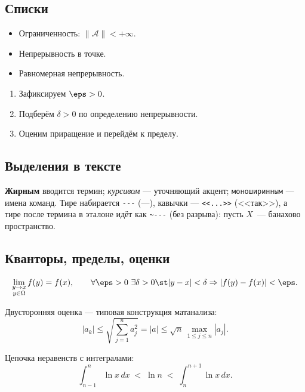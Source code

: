 
\subsection{Списки}

\begin{itemize}
	\item Ограниченность: $\|\mathcal{A}\| < +\infty$.
	\item Непрерывность в точке.
	\item Равномерная непрерывность.
\end{itemize}

\begin{enumerate}
	\item Зафиксируем $\eps > 0$.
	\item Подберём $\delta > 0$ по определению непрерывности.
	\item Оценим приращение и перейдём к пределу.
\end{enumerate}

\subsection{Выделения в тексте}

\textbf{Жирным} вводится термин; \emph{курсивом} --- уточняющий акцент;
\texttt{моноширинным} --- имена команд. Тире набирается \verb|---| (---),
кавычки --- \verb|<<...>>| (<<так>>), а тире после термина в эталоне
идёт как \verb|~---| (без разрыва): пусть $X$~--- банахово пространство.

\subsection{Кванторы, пределы, оценки}

\[
\lim_{\substack{y\to x\\ y\in\Omega}} f(y) = f(x),
\qquad
\forall \eps>0\ \exists \delta>0 \st |y-x|<\delta \Rightarrow |f(y)-f(x)|<\eps.
\]

Двусторонняя оценка --- типовая конструкция матанализа:
\[
|a_k| \le \sqrt{\sum_{j=1}^{n} a_j^2} = |a| \le \sqrt{n}\,\max_{1\le j\le n}|a_j|.
\]

Цепочка неравенств с интегралами:
\[
\int_{n-1}^{n}\ln x\,dx \;<\; \ln n \;<\; \int_{n}^{n+1}\ln x\,dx .
\]

